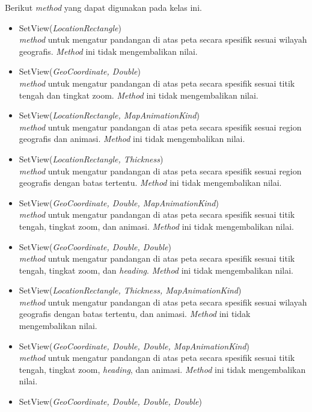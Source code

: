 \newpage
Berikut \textit{method} yang dapat digunakan pada kelas ini.
\begin{itemize}
	\item SetView(\textit{LocationRectangle}) \\
	\textit{method} untuk mengatur pandangan di atas peta secara spesifik sesuai wilayah geografis. \textit{Method} ini tidak mengembalikan nilai.
	\item SetView(\textit{GeoCoordinate, Double}) \\
	\textit{method} untuk mengatur pandangan di atas peta secara spesifik sesuai titik tengah dan tingkat zoom. \textit{Method} ini tidak mengembalikan nilai.
	\item SetView(\textit{LocationRectangle, MapAnimationKind})\\
	\textit{method} untuk mengatur pandangan di atas peta secara spesifik sesuai region geografis dan animasi. \textit{Method} ini tidak mengembalikan nilai.
	\item SetView(\textit{LocationRectangle, Thickness}) \\
	\textit{method} untuk mengatur pandangan di atas peta secara spesifik sesuai region geografis dengan batas tertentu. \textit{Method} ini tidak mengembalikan nilai.
	\item SetView(\textit{GeoCoordinate, Double, MapAnimationKind}) \\
	\textit{method} untuk mengatur pandangan di atas peta secara spesifik sesuai titik tengah, tingkat zoom, dan animasi. \textit{Method} ini tidak mengembalikan nilai.
	\item SetView(\textit{GeoCoordinate, Double, Double}) \\
	\textit{method} untuk mengatur pandangan di atas peta secara spesifik sesuai titik tengah, tingkat zoom, dan \textit{heading}. \textit{Method} ini tidak mengembalikan nilai.
	\item SetView(\textit{LocationRectangle, Thickness, MapAnimationKind}) \\
	\textit{method} untuk mengatur pandangan di atas peta secara spesifik sesuai wilayah geografis dengan batas tertentu, dan animasi. \textit{Method} ini tidak mengembalikan nilai.
	\item SetView(\textit{GeoCoordinate, Double, Double, MapAnimationKind}) \\
	\textit{method} untuk mengatur pandangan di atas peta secara spesifik sesuai titik tengah, tingkat zoom, \textit{heading}, dan animasi. \textit{Method} ini tidak mengembalikan nilai.	
	\item SetView(\textit{GeoCoordinate, Double, Double, Double}) \\

\end{itemize}
